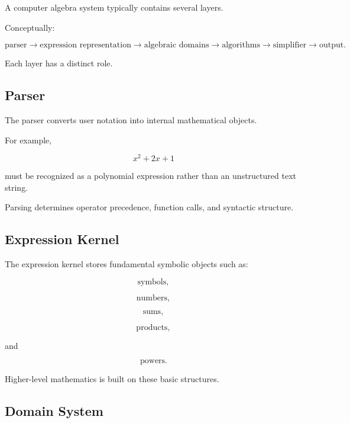 A computer algebra system typically contains several layers.

Conceptually:

\[
\boxed{
\text{parser}
\rightarrow
\text{expression representation}
\rightarrow
\text{algebraic domains}
\rightarrow
\text{algorithms}
\rightarrow
\text{simplifier}
\rightarrow
\text{output}.
}
\]

Each layer has a distinct role.

\subsection{Parser}
\label{subsec:cas-parser}

The parser converts user notation into internal mathematical objects.

For example,

\[
\boxed{
x^2+2x+1
}
\]

must be recognized as a polynomial expression rather than an unstructured
text string.

Parsing determines operator precedence, function calls, and syntactic
structure.

\subsection{Expression Kernel}
\label{subsec:expression-kernel}

The expression kernel stores fundamental symbolic objects such as:

\[
\boxed{
\text{symbols},
}
\]

\[
\boxed{
\text{numbers},
}
\]

\[
\boxed{
\text{sums},
}
\]

\[
\boxed{
\text{products},
}
\]

and

\[
\boxed{
\text{powers}.
}
\]

Higher-level mathematics is built on these basic structures.

\subsection{Domain System}
\label{subsec:cas-domain-system}

